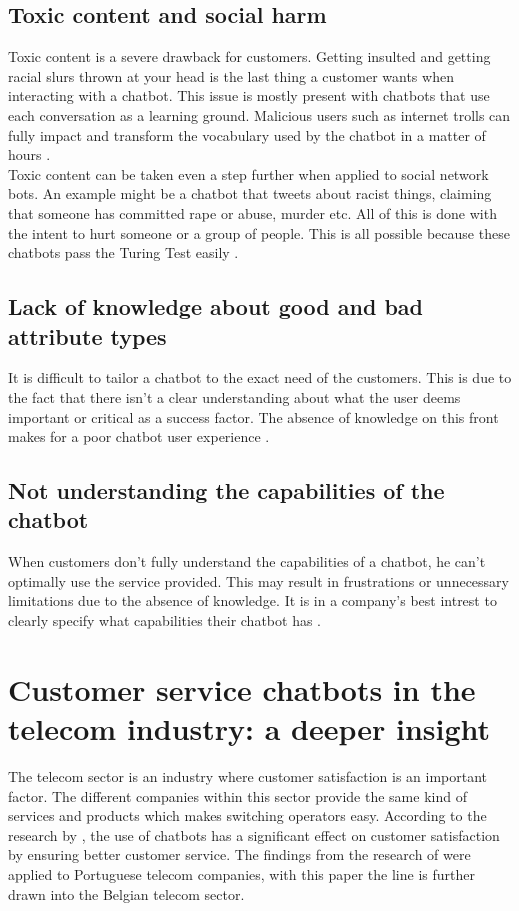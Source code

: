 \subsection{Toxic content and social harm}
Toxic content is a severe drawback for customers. Getting insulted and getting racial slurs thrown at your head is the last thing a customer wants when interacting with a chatbot. This issue is mostly present with chatbots that use each conversation as a learning ground. Malicious users such as internet trolls can fully impact and transform the vocabulary used by the chatbot in a matter of hours \citep{Adamopoulou2020}.\\
\break
Toxic content can be taken even a step further when applied to social network bots. An example might be a chatbot that tweets about racist things, claiming that someone has committed rape or abuse, murder etc. All of this is done with the intent to hurt someone or a group of people. This is all possible because these chatbots pass the Turing Test easily \citep{Radziwil2021}.

\subsection{Lack of knowledge about good and bad attribute types}
It is difficult to tailor a chatbot to the exact need of the customers. This is due to the fact that there isn't a clear understanding about what the user deems important or critical as a success factor. The absence of knowledge on this front makes for a poor chatbot user experience \citep{brandtzaeg2020}.

\subsection{Not understanding the capabilities of the chatbot}
When customers don't fully understand the capabilities of a chatbot, he can't optimally use the service provided. This may result in frustrations or unnecessary limitations due to the absence of knowledge. It is in a company's best intrest to clearly specify what capabilities their chatbot has \citep{brandtzaeg2020}.

\section{Customer service chatbots in the telecom industry: a deeper insight}
The telecom sector is an industry where customer satisfaction is an important factor. The different companies within this sector provide the same kind of services and products which makes switching operators easy. According to the research by \citep{Quintino2019}, the use of chatbots has a significant effect on customer satisfaction by ensuring better customer service. The findings from the research of \citeauthor{Quintino1019} were applied to Portuguese telecom companies, with this paper the line is further drawn into the Belgian telecom sector.\\
